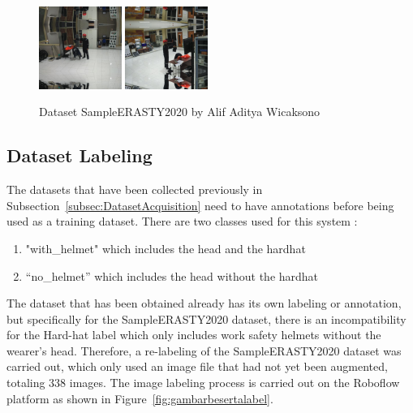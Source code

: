 \begin{enumerate}
  \begin{figure}[ht]
    \centering
    \includegraphics[width=0.24\textwidth]{gambar/sample_erasty/APB-Hat-6-_jpg.rf.79aa17f23c1834efa681edc7aca5cd5f.jpg}
    \includegraphics[width=0.24\textwidth]{gambar/sample_erasty/APB-Hat-7-_jpg.rf.4e9ff94579f598546de38a9b5c88a05d.jpg}
    \caption{Dataset SampleERASTY2020 by Alif Aditya Wicaksono}
    \label{fig:dataseterastypreview}  
  \end{figure}

\end{enumerate}

\subsection{Dataset Labeling}
\label{subsec:dataset_labeling}

\par The datasets that have been collected previously in Subsection~\ref{subsec:DatasetAcquisition} need to have annotations before being used as a training dataset. There are two classes used for this system :

\begin{enumerate}[nolistsep]
  \item "with\_helmet" which includes the head and the hardhat
  \item “no\_helmet” which includes the head without the hardhat
\end{enumerate}

\par The dataset that has been obtained already has its own labeling or annotation, but specifically for the SampleERASTY2020 dataset, there is an incompatibility for the Hard-hat label which only includes work safety helmets without the wearer's head. Therefore, a re-labeling of the SampleERASTY2020 dataset was carried out, which only used an image file that had not yet been augmented, totaling 338 images. The image labeling process is carried out on the Roboflow platform as shown in Figure~\ref{fig:gambarbesertalabel}.

